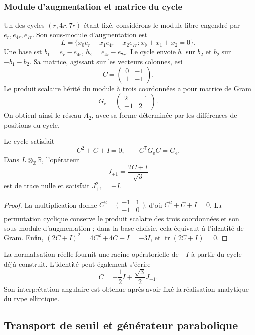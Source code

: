 \subsubsection{Module d’augmentation et matrice du cycle}

Un des cycles \((r,4r,7r)\) étant fixé, considérons le module libre
engendré par \(e_r,e_{4r},e_{7r}\). Son sous-module d’augmentation est
\[
 L=\{x_0e_r+x_1e_{4r}+x_2e_{7r}:x_0+x_1+x_2=0\}.
\]
Une base est \(b_1=e_r-e_{4r}\), \(b_2=e_{4r}-e_{7r}\). Le cycle
envoie \(b_1\) sur \(b_2\) et \(b_2\) sur \(-b_1-b_2\). Sa matrice,
agissant sur les vecteurs colonnes, est
\[
 C=\begin{pmatrix}0&-1\\1&-1\end{pmatrix}.
\]
Le produit scalaire hérité du module à trois coordonnées a pour matrice
de Gram
\[
 G_{\mathrm e}=\begin{pmatrix}2&-1\\-1&2\end{pmatrix}.
\]
On obtient ainsi le réseau \(A_2\), avec sa forme déterminée par les
différences de positions du cycle.

\begin{proposicion}
\label{eul:prop:eliptico}
Le cycle satisfait
\[
 C^2+C+I=0,\qquad C^\mathsf TG_{\mathrm e}C=G_{\mathrm e}.
\]
Dans \(L\otimes_{\mathbb Z}\mathbb R\), l’opérateur
\[
 J_{+1}=\frac{2C+I}{\sqrt3}
\]
est de trace nulle et satisfait \(J_{+1}^2=-I\).
\end{proposicion}
\begin{proof}
La multiplication donne
\(C^2=\bigl(\begin{smallmatrix}-1&1\\-1&0\end{smallmatrix}\bigr)\),
d’où \(C^2+C+I=0\). La permutation cyclique conserve le
produit scalaire des trois coordonnées et son sous-module d’augmentation ;
dans la base choisie, cela équivaut à l’identité de Gram. Enfin,
\((2C+I)^2=4C^2+4C+I=-3I\), et
\(\operatorname{tr}(2C+I)=0\).
\end{proof}

La normalisation réelle fournit une racine opératorielle de \(-I\) à
partir du cycle déjà construit. L’identité peut également s’écrire
\[
 C=-\frac12I+\frac{\sqrt3}{2}J_{+1}.
\]
Son interprétation angulaire est obtenue après avoir fixé la réalisation
analytique du type elliptique.

\subsection{Transport de seuil et générateur parabolique}
\label{eul:parabolico}

